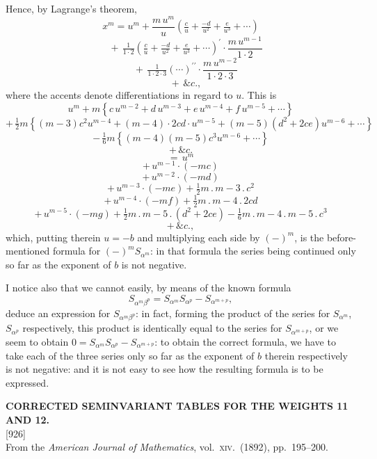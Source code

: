\documentclass[11pt,a4paper]{article}
\newcommand{\paper}[3]{%
  \clearpage
  \begin{center}
    {\large\bfseries #2}\\[0.5em]
    {\small [#1]}\\[0.3em]
    {\small #3}
  \end{center}
  \vspace{0.5em}
}
\begin{document}
Hence, by Lagrange's theorem,
\[
x^m = u^m + \frac{m\,u^m}{u}\!\left(\tfrac{c}{u} + \tfrac{-d}{u^2} + \tfrac{e}{u^3} + \cdots\right)
\]
\[
\quad +\,\tfrac{1}{1\cdot 2}\!\left(\tfrac{c}{u} + \tfrac{-d}{u^2} + \tfrac{e}{u^3} + \cdots\right)^{\!\prime}\cdot\frac{m\,u^{m-1}}{1\cdot 2}
\]
\[
\quad +\,\tfrac{1}{1\cdot 2\cdot 3}\!\left(\cdots\right)^{\!\prime\prime}\cdot\frac{m\,u^{m-2}}{1\cdot 2\cdot 3}
\]
\[
\quad +\,\&c.,
\]
where the accents denote differentiations in regard to $u$. This is
\[
u^m + m\!\left\{c\,u^{m-2} + d\,u^{m-3} + e\,u^{m-4} + f\,u^{m-5} + \cdots\right\}
\]
\[
+\,\tfrac{1}{2}m\!\left\{(m - 3)c^2 u^{m-4} + (m - 4)\cdot 2cd\cdot u^{m-5} + (m - 5)(d^2 + 2ce)u^{m-6} + \cdots\right\}
\]
\[
-\,\tfrac{1}{6}m\!\left\{(m - 4)(m - 5) c^3 u^{m-6} + \cdots\right\}
\]
\[
+\,\&c.
\]
\[
=\,u^m
\]
\[
+\,u^{m-1}\cdot(-mc)
\]
\[
+\,u^{m-2}\cdot(-md)
\]
\[
+\,u^{m-3}\cdot(-me) + \tfrac{1}{2}m\,.\,m-3\,.\,c^2
\]
\[
+\,u^{m-4}\cdot(-mf) + \tfrac{1}{2}m\,.\,m-4\,.\,2cd
\]
\[
+\,u^{m-5}\cdot(-mg) + \tfrac{1}{2}m\,.\,m-5\,.\,(d^2 + 2ce) - \tfrac{1}{6}m\,.\,m-4\,.\,m-5\,.\,c^3
\]
\[
+\,\&c.,
\]
which, putting therein $u = -b$ and multiplying each side by $(-)^m$, is the before-mentioned formula for $(-)^m S_{\alpha^m}$: in that formula the series being continued only so far as the exponent of $b$ is not negative.

I notice also that we cannot easily, by means of the known formula
\[
S_{\alpha^m \beta^p} = S_{\alpha^m} S_{\alpha^p} - S_{\alpha^{m+p}},
\]
deduce an expression for $S_{\alpha^m \beta^p}$: in fact, forming the product of the series for $S_{\alpha^m}$, $S_{\alpha^p}$ respectively, this product is identically equal to the series for $S_{\alpha^{m+p}}$, or we seem to obtain $0 = S_{\alpha^m} S_{\alpha^p} - S_{\alpha^{m+p}}$: to obtain the correct formula, we have to take each of the three series only so far as the exponent of $b$ therein respectively is not negative: and it is not easy to see how the resulting formula is to be expressed.

\paper{926}{CORRECTED SEMINVARIANT TABLES FOR THE WEIGHTS 11 AND 12.}{From the \textit{American Journal of Mathematics}, vol.\ \textsc{xiv}.\ (1892), pp.\ 195--200.}
\end{document}
